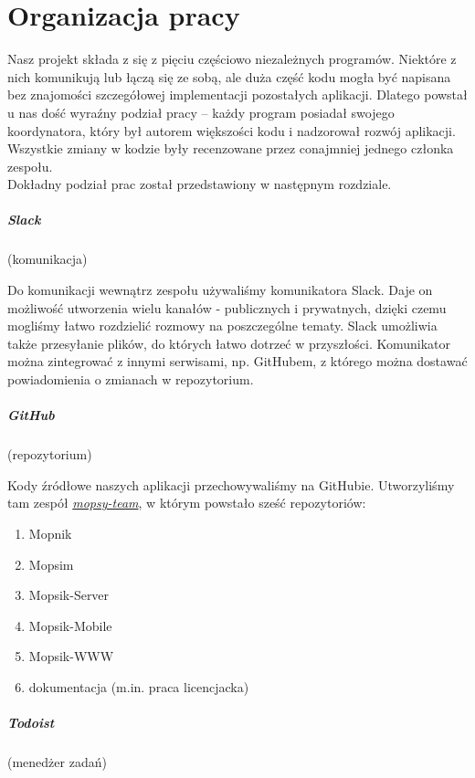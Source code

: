 \chapter{Organizacja pracy}
Nasz projekt składa z się z pięciu częściowo niezależnych programów. Niektóre z nich komunikują lub łączą się ze sobą, ale duża część kodu mogła być napisana bez znajomości szczegółowej implementacji pozostałych aplikacji. Dlatego powstał u nas dość wyraźny podział pracy -- każdy program posiadał swojego koordynatora, który był autorem większości kodu i nadzorował rozwój aplikacji. Wszystkie zmiany w kodzie były recenzowane przez conajmniej jednego członka zespołu.\\
Dokładny podział prac został przedstawiony w następnym rozdziale. 

\paragraph{Slack}(komunikacja)

Do komunikacji wewnątrz zespołu używaliśmy komunikatora Slack. Daje on możliwość utworzenia wielu kanałów - publicznych i prywatnych, dzięki czemu mogliśmy łatwo rozdzielić rozmowy na poszczególne tematy. Slack umożliwia także przesyłanie plików, do których łatwo dotrzeć w przyszłości. Komunikator można zintegrować z innymi serwisami, np. GitHubem, z którego można dostawać powiadomienia o zmianach w repozytorium.

\paragraph{GitHub}(repozytorium)

Kody źródłowe naszych aplikacji przechowywaliśmy na GitHubie. Utworzyliśmy tam zespół \href{https://github.com/mopsy-team}{\textit{mopsy-team}}, w którym powstało sześć repozytoriów:
\begin{enumerate}
\item Mopnik
\item Mopsim
\item Mopsik-Server
\item Mopsik-Mobile
\item Mopsik-WWW
\item dokumentacja (m.in. praca licencjacka)
\end{enumerate}

\paragraph{Todoist}(menedżer zadań)


